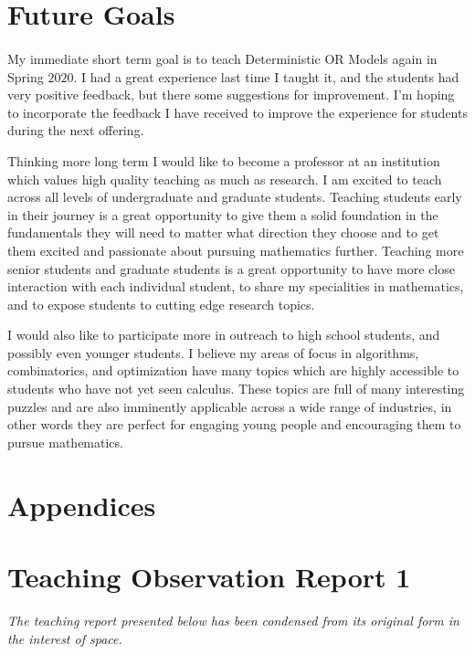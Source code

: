\documentclass{article}
\begin{document}
\section{Future Goals}

\paragraph{}
My immediate short term goal is to teach Deterministic OR Models again in Spring $2020$. I had a great experience last time I taught it, and the students had very positive feedback, but there some suggestions for improvement. I'm hoping to incorporate the feedback I have received to improve the experience for students during the next offering.

Thinking more long term I would like to become a professor at an institution which values high quality teaching as much as research. I am excited to teach across all levels of undergraduate and graduate students. Teaching students early in their journey is a great opportunity to give them a solid foundation in the fundamentals they will need to matter what direction they choose and to get them excited and passionate about pursuing mathematics further. Teaching more senior students and graduate students is a great opportunity to have more close interaction with each individual student, to share my specialities in mathematics, and to expose students to cutting edge research topics.

I would also like to participate more in outreach to high school students, and possibly even younger students. I believe my areas of focus in algorithms, combinatorics, and optimization have many topics which are highly accessible to students who have not yet seen calculus. These topics are full of many interesting puzzles and are also imminently applicable across a wide range of industries, in other words they are perfect for engaging young people and encouraging them to pursue mathematics.

\appendix
\section*{Appendices}
\section{Teaching Observation Report 1}\label{sec:observation-report-1}
\emph{The teaching report presented below has been condensed from its original form in the interest of space.}
\end{document}
